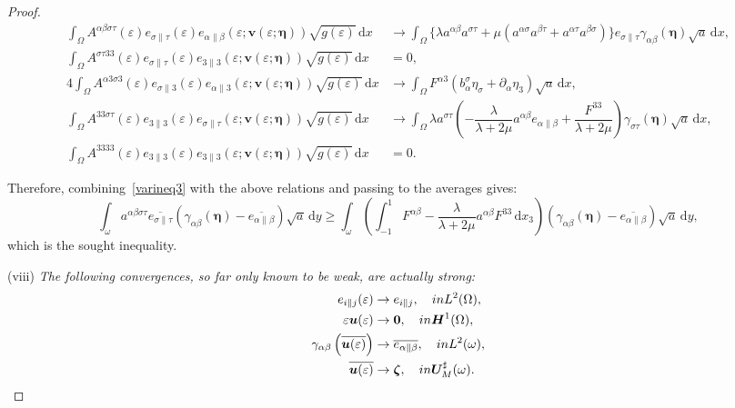 \documentclass{amsart}
\def\dd{\, \mathrm{d}}
\begin{document}
\begin{proof}
\begin{equation*}
\begin{aligned}
		\int_{\Omega}A^{\alpha\beta\sigma\tau}(\varepsilon) e_{\sigma\|\tau}(\varepsilon)e_{\alpha\|\beta}(\varepsilon;\bm{v}(\varepsilon;\bm{\eta})) \sqrt{g(\varepsilon)} \dd x &\to 
		\int_{\Omega}\{\lambda a^{\alpha\beta}a^{\sigma\tau}+\mu(a^{\alpha\sigma}a^{\beta\tau}+a^{\alpha\tau}a^{\beta\sigma})\} e_{\sigma\|\tau} \gamma_{\alpha\beta}(\bm{\eta}) \sqrt{a} \dd x,\\
		\int_{\Omega}A^{\sigma\tau33}(\varepsilon) e_{\sigma\|\tau}(\varepsilon)e_{3\|3}(\varepsilon;\bm{v}(\varepsilon;\bm{\eta})) \sqrt{g(\varepsilon)}\dd x &=0,\\
		4\int_{\Omega}A^{\alpha3\sigma3}(\varepsilon) e_{\sigma\|3}(\varepsilon)e_{\alpha\|3}(\varepsilon;\bm{v}(\varepsilon;\bm{\eta})) \sqrt{g(\varepsilon)} \dd x &\to \int_{\Omega} F^{\alpha3}(b_\alpha^\sigma \eta_\sigma+\partial_\alpha\eta_3) \sqrt{a} \dd x,\\
		\int_{\Omega}A^{33\sigma\tau}(\varepsilon) e_{3\|3}(\varepsilon)e_{\sigma\|\tau}(\varepsilon;\bm{v}(\varepsilon;\bm{\eta})) \sqrt{g(\varepsilon)} \dd x &\to \int_{\Omega} \lambda a^{\sigma\tau}\left(-\dfrac{\lambda}{\lambda+2\mu}a^{\alpha\beta} e_{\alpha\|\beta}+\dfrac{F^{33}}{\lambda+2\mu}\right) \gamma_{\sigma\tau}(\bm{\eta}) \sqrt{a} \dd x,\\
		\int_{\Omega}A^{3333}(\varepsilon) e_{3\|3}(\varepsilon)e_{3\|3}(\varepsilon;\bm{v}(\varepsilon;\bm{\eta})) \sqrt{g(\varepsilon)} \dd x &=0.
	\end{aligned}
\end{equation*}

Therefore, combining~\eqref{varineq3} with the above relations and passing to the averages gives:
\begin{equation*}
\int_{\omega} a^{\alpha\beta\sigma\tau} \overline{e_{\sigma\|\tau}} \left(\gamma_{\alpha\beta}(\bm{\eta})-\overline{e_{\alpha\|\beta}}\right) \sqrt{a} \dd y \ge \int_{\omega} \left(\int_{-1}^{1} F^{\alpha\beta}-\dfrac{\lambda}{\lambda+2\mu} a^{\alpha\beta}F^{33} \dd x_3\right) \left(\gamma_{\alpha\beta}(\bm{\eta})-\overline{e_{\alpha\|\beta}}\right) \sqrt{a} \dd y,
\end{equation*}
which is the sought inequality.

(viii) \emph{The following convergences, so far only known to be weak, are actually strong:}
\begin{equation*}
	\begin{aligned}
		e_{i\|j}(\varepsilon) &\to e_{i\|j},\quad\textup{ in }L^2(\Omega),\\
		\varepsilon\bm{u}(\varepsilon) &\to \bm{0},\quad\textup{ in }\bm{H}^1(\Omega),\\
		\gamma_{\alpha\beta}\left(\overline{\bm{u}(\varepsilon)}\right) &\to \overline{e_{\alpha\|\beta}},\quad\textup{ in }L^2(\omega),\\
		\overline{\bm{u}(\varepsilon)} &\to \bm{\zeta},\quad\textup{ in }\bm{U}_M^\sharp(\omega).
	\end{aligned}
\end{equation*}


\end{proof}
\end{document}
